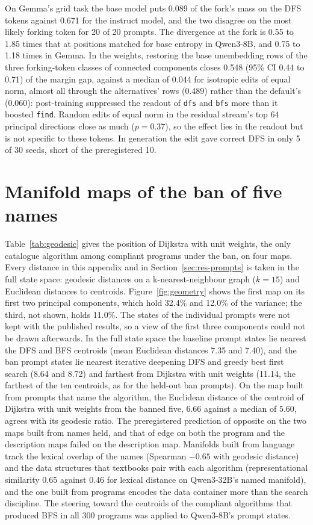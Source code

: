 \documentclass[11pt,letterpaper]{article}
\newcommand{\stok}[1]{\texttt{\textvisiblespace#1}}
\begin{document}
On Gemma's grid task the base model puts 0.089 of the fork's mass on the DFS tokens against 0.671 for the instruct model, and the two disagree on the most likely forking token for 20 of 20 prompts. The divergence at the fork is 0.55 to 1.85 times that at positions matched for base entropy in Qwen3-8B, and 0.75 to 1.18 times in Gemma. In the weights, restoring the base unembedding rows of the three forking-token classes of connected components closes 0.548 (95\% CI 0.44 to 0.71) of the margin gap, against a median of 0.044 for isotropic edits of equal norm, almost all through the alternatives' rows (0.489) rather than the default's (0.060): post-training suppressed the readout of \stok{dfs} and \stok{bfs} more than it boosted \stok{find}. Random edits of equal norm in the residual stream's top 64 principal directions close as much ($p = 0.37$), so the effect lies in the readout but is not specific to these tokens. In generation the edit gave correct DFS in only 5 of 30 seeds, short of the preregistered 10.

\section{Manifold maps of the ban of five names}
\label{app:maps}

Table~\ref{tab:geodesic} gives the position of Dijkstra with unit weights, the only catalogue algorithm among compliant programs under the ban, on four maps. Every distance in this appendix and in Section~\ref{sec:res-prompts} is taken in the full state space: geodesic distances on a k-nearest-neighbour graph ($k = 15$) and Euclidean distances to centroids. Figure~\ref{fig:geometry} shows the first map on its first two principal components, which hold 32.4\% and 12.0\% of the variance; the third, not shown, holds 11.0\%. The states of the individual prompts were not kept with the published results, so a view of the first three components could not be drawn afterwards. In the full state space the baseline prompt states lie nearest the DFS and BFS centroids (mean Euclidean distances 7.35 and 7.40), and the ban prompt states lie nearest iterative deepening DFS and greedy best first search (8.64 and 8.72) and farthest from Dijkstra with unit weights (11.14, the farthest of the ten centroids, as for the held-out ban prompts). On the map built from prompts that name the algorithm, the Euclidean distance of the centroid of Dijkstra with unit weights from the banned five, 6.66 against a median of 5.60, agrees with its geodesic ratio. The preregistered prediction of opposite on the two maps built from names held, and that of edge on both the program and the description maps failed on the description map. Manifolds built from language track the lexical overlap of the names (Spearman $-0.65$ with geodesic distance) and the data structures that textbooks pair with each algorithm (representational similarity 0.65 against 0.46 for lexical distance on Qwen3-32B's named manifold), and the one built from programs encodes the data container more than the search discipline. The steering toward the centroids of the compliant algorithms that produced BFS in all 300 programs was applied to Qwen3-8B's prompt states.
\end{document}
